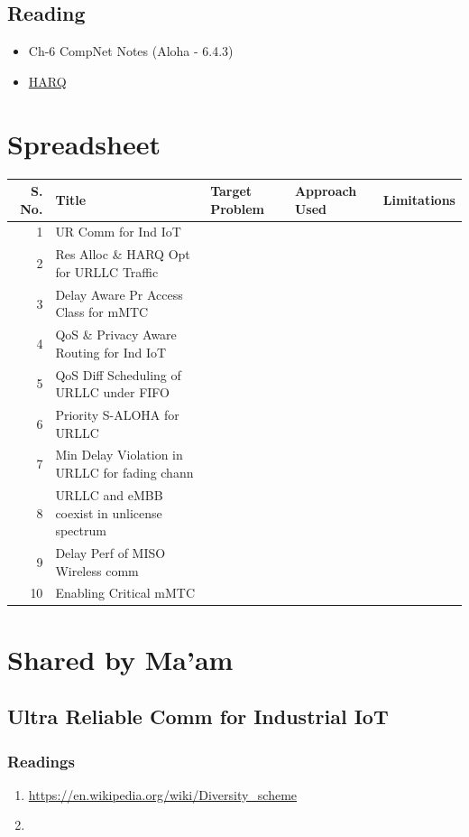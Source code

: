 \documentclass[11pt]{article}
\begin{document}
\subsection{Reading}
\label{sec:org6d85366}
\begin{itemize}
\item Ch-6 CompNet Notes (Aloha - 6.4.3)
\item \href{https://www.techplayon.com/hybrid-automatic-repeat-request-harq-in-lte-fdd/}{HARQ}
\end{itemize}
\section{Spreadsheet}
\label{sec:org23a983e}
\begin{center}
\begin{tabular}{rllll}
S. No. & Title & Target Problem & Approach Used & Limitations\\
\hline
1 & UR Comm for Ind IoT &  &  & \\
2 & Res Alloc \& HARQ Opt for URLLC Traffic &  &  & \\
3 & Delay Aware Pr Access Class for mMTC &  &  & \\
4 & QoS \& Privacy Aware Routing for Ind IoT &  &  & \\
5 & QoS Diff Scheduling of URLLC under FIFO &  &  & \\
6 & Priority S-ALOHA for URLLC &  &  & \\
7 & Min Delay Violation in URLLC for fading chann &  &  & \\
8 & URLLC and eMBB coexist in unlicense spectrum &  &  & \\
9 & Delay Perf of MISO Wireless comm &  &  & \\
10 & Enabling Critical mMTC &  &  & \\
\end{tabular}
\end{center}
\section{Shared by Ma'am}
\label{sec:org0d34ed6}
\subsection{Ultra Reliable Comm for Industrial IoT}
\label{sec:org25ab150}
\subsubsection{Readings}
\label{sec:org42f416e}
\begin{enumerate}
\item \url{https://en.wikipedia.org/wiki/Diversity\_scheme}
\item 
\end{enumerate}
\end{document}
